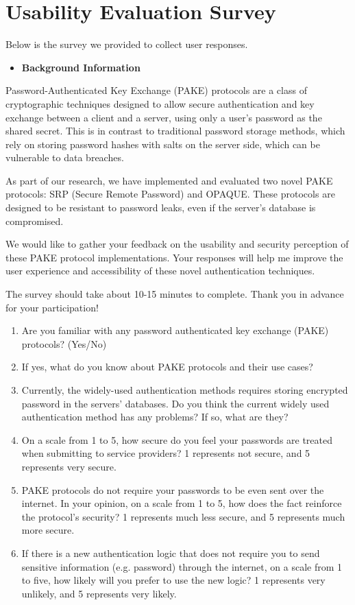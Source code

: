 \section{Usability Evaluation Survey}
\label{sec:survey}

Below is the survey we provided to collect user responses.

\begin{itemize}
    \item \textbf{Background Information}    
\end{itemize}


Password-Authenticated Key Exchange (PAKE) protocols are a class of cryptographic techniques designed to allow secure authentication and key exchange between a client and a server, using only a user's password as the shared secret. This is in contrast to traditional password storage methods, which rely on storing password hashes with salts on the server side, which can be vulnerable to data breaches.

As part of our research, we have implemented and evaluated two novel PAKE protocols: SRP (Secure Remote Password) and OPAQUE. These protocols are designed to be resistant to password leaks, even if the server's database is compromised.

We would like to gather your feedback on the usability and security perception of these PAKE protocol implementations. Your responses will help me improve the user experience and accessibility of these novel authentication techniques.

The survey should take about 10-15 minutes to complete. Thank you in advance for your participation!

\begin{enumerate}
    \item Are you familiar with any password authenticated key exchange (PAKE) protocols? (Yes/No)
    \item If yes, what do you know about PAKE protocols and their use cases?
    \item Currently, the widely-used authentication methods requires storing encrypted password in the servers' databases. Do you think the current widely used authentication method has any problems? If so, what are they?
    \item On a scale from 1 to 5, how secure do you feel your passwords are treated when submitting to service providers? 1 represents not secure, and 5 represents very secure.
    \item PAKE protocols do not require your passwords to be even sent over the internet. In your opinion, on a scale from 1 to 5, how does the fact reinforce the protocol's security? 1 represents much less secure, and 5 represents much more secure.
    \item If there is a new authentication logic that does not require you to send sensitive information (e.g. password) through the internet, on a scale from 1 to five, how likely will you prefer to use the new logic? 1 represents very unlikely, and 5 represents very likely.
\end{enumerate}



